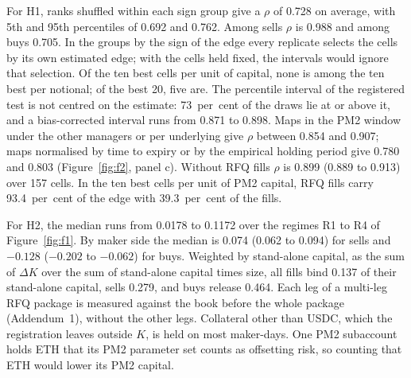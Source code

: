 \documentclass[a4paper,fleqn]{cas-dc}
\begin{document}
For H1, ranks shuffled within each sign group give a $\rho$ of 0.728 on average, with 5th and 95th percentiles
of 0.692 and 0.762. Among sells $\rho$ is 0.988 and among buys 0.705. In the groups by the sign of the edge
every replicate selects the cells by its own estimated edge; with the cells held fixed, the intervals would
ignore that selection. Of the ten best cells per unit of capital, none is among the ten best per notional; of
the best 20, five are. The percentile interval of the registered test is not centred on the estimate:
73~per~cent of the draws lie at or above it, and a bias-corrected interval runs from 0.871 to 0.898. Maps in the PM2
window under the other managers or per underlying give $\rho$ between 0.854 and 0.907; maps normalised by time
to expiry or by the empirical holding period give 0.780 and 0.803 (Figure~\ref{fig:f2}, panel c).
Without RFQ fills $\rho$ is 0.899 (0.889 to 0.913) over 157 cells. In the ten best cells per unit of PM2
capital, RFQ fills carry 93.4~per~cent of the edge with 39.3~per~cent of the fills.

For H2, the median runs from 0.0178 to 0.1172 over the regimes R1 to R4 of
Figure~\ref{fig:f1}. By maker side the median is 0.074 (0.062 to 0.094) for sells and $-0.128$ ($-0.202$ to
$-0.062$) for buys. Weighted by stand-alone capital, as the sum of $\Delta K$ over the sum of stand-alone capital
times size, all fills bind 0.137 of their stand-alone capital, sells 0.279, and buys release 0.464. Each leg of a
multi-leg RFQ package is measured against the book before the whole package (Addendum~1), without the other legs.
Collateral other than USDC, which the registration leaves outside $K$, is held on most maker-days. One PM2
subaccount holds ETH that its PM2 parameter set counts as offsetting risk, so counting that ETH would lower its
PM2 capital.
\end{document}
